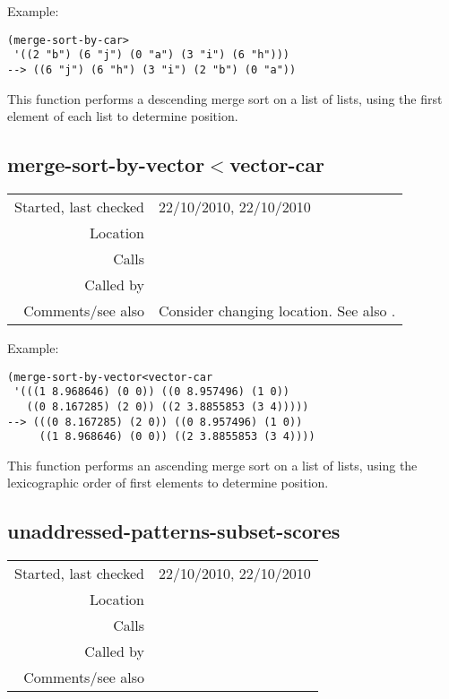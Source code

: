 \vspace{0.5cm}
\noindent Example:
\begin{verbatim}
(merge-sort-by-car>
 '((2 "b") (6 "j") (0 "a") (3 "i") (6 "h")))
--> ((6 "j") (6 "h") (3 "i") (2 "b") (0 "a"))
\end{verbatim}

\noindent This function performs a descending merge
sort on a list of lists, using the first element of
each list to determine position.


\subsection*{merge-sort-by-vector$<$vector-car}\label{fun:merge-sort-by-vector<vector-car}

\vspace{0.3cm}
\begin{tabular}{r|p{8cm}}
Started, last checked & 22/10/2010, 22/10/2010 \\
Location & \nameref{sec:generating-with-patterns-preliminaries} \\
Calls & \nameref{fun:vector<vector-car} \\
Called by & \nameref{fun:indices-of-max-subset-score} \\
Comments/see also & Consider changing location. See also \nameref{fun:vector<vector}.
\end{tabular}

\vspace{0.5cm}
\noindent Example:
\begin{verbatim}
(merge-sort-by-vector<vector-car
 '(((1 8.968646) (0 0)) ((0 8.957496) (1 0))
   ((0 8.167285) (2 0)) ((2 3.8855853 (3 4)))))
--> (((0 8.167285) (2 0)) ((0 8.957496) (1 0))
     ((1 8.968646) (0 0)) ((2 3.8855853 (3 4))))
\end{verbatim}

\noindent This function performs an ascending merge
sort on a list of lists, using the lexicographic
order of first elements to determine position.


\subsection*{unaddressed-patterns-subset-scores}\label{fun:unaddressed-patterns-subset-scores}

\vspace{0.3cm}
\begin{tabular}{r|p{8cm}}
Started, last checked & 22/10/2010, 22/10/2010 \\
Location & \nameref{sec:generating-with-patterns-preliminaries} \\
Calls & \nameref{fun:pair-off-lists} \\
Called by & \nameref{fun:indices-of-max-subset-score} \\
Comments/see also &
\end{tabular}

